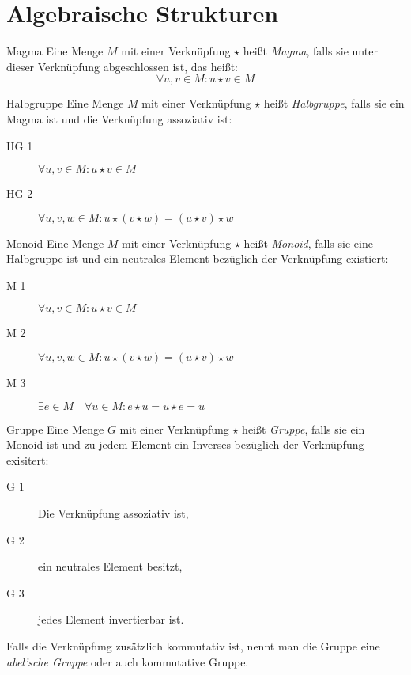\chapter{Algebraische Strukturen}
\begin{definition}{Magma}
	Eine Menge $M$ mit einer Verknüpfung $\star$ heißt \emph{Magma}, falls sie unter dieser Verknüpfung abgeschlossen ist, das heißt:
	\begin{equation*}
	  \forall u,v \in M: u\star v\in M
	\end{equation*}
\end{definition}

\begin{definition}{Halbgruppe}
	Eine Menge $M$ mit einer Verknüpfung $\star$ heißt \emph{Halbgruppe}, falls sie ein Magma ist und die Verknüpfung assoziativ ist:
	\begin{description}
	  \item[HG 1] $\forall u,v \in M: u\star v\in M$
	  \item[HG 2] $\forall u,v,w \in M: u\star(v\star w)=(u\star v)\star w$
	\end{description}
\end{definition}

\begin{definition}{Monoid}
	Eine Menge $M$ mit einer Verknüpfung $\star$ heißt \emph{Monoid}, falls sie eine Halbgruppe ist und ein neutrales Element bezüglich der Verknüpfung existiert:
	\begin{description}
	  \item[M 1] $\forall u,v \in M: u\star v\in M$
	  \item[M 2] $\forall u,v,w \in M: u\star(v\star w)=(u\star v)\star w$
	  \item[M 3] $\exists e \in M \quad \forall u\in M: e\star u=u\star e = u$
	\end{description}
\end{definition}

\begin{definition}{Gruppe}
	Eine Menge $G$ mit einer Verknüpfung $\star$ heißt \emph{Gruppe}, falls sie ein Monoid ist und zu jedem Element ein Inverses bezüglich der Verknüpfung exisitert:
	\begin{description}
	  \item[G 1] Die Verknüpfung assoziativ ist,
	  \item[G 2] ein neutrales Element besitzt,
	  \item[G 3] jedes Element invertierbar ist.
	\end{description}
	Falls die Verknüpfung zusätzlich kommutativ ist, nennt man die Gruppe eine \emph{abel'sche Gruppe} oder auch kommutative Gruppe.
\end{definition}

